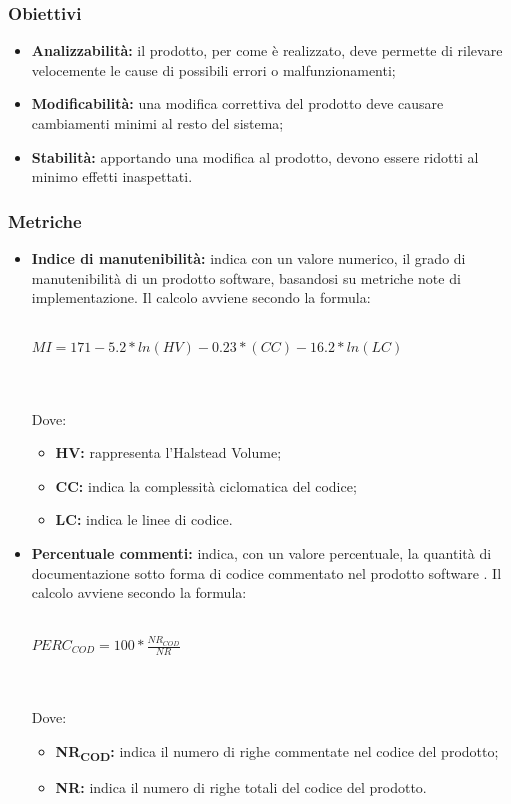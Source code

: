 \subsubsection{Obiettivi}
\begin{itemize}
	\item \textbf{Analizzabilità:} il prodotto, per come è realizzato, deve permette di rilevare velocemente le cause di possibili errori o malfunzionamenti;
	\item \textbf{Modificabilità:} una modifica correttiva del prodotto deve causare cambiamenti minimi al resto del sistema;
	\item \textbf{Stabilità:} apportando una modifica al prodotto, devono essere ridotti al minimo effetti inaspettati.
\end{itemize}
\subsubsection{Metriche}
\begin{itemize}
	\item \textbf{Indice di manutenibilità:} indica con un valore numerico, il grado di manutenibilità di un prodotto software, basandosi su metriche note di implementazione. Il calcolo avviene secondo la formula:\\\\
	\centerline{
		\begin{math}
		MI= 171-5.2*ln(HV)-0.23*(CC)-16.2*ln(LC)
		\end{math}
	}
	\\\\Dove:
	\begin{itemize}
		\item \textbf{HV:} rappresenta l'Halstead Volume;
		\item \textbf{CC:} indica la complessità ciclomatica del codice;
		\item \textbf{LC:} indica le linee di codice.
	\end{itemize}	
	\item \textbf{Percentuale commenti:} indica, con un valore percentuale, la quantità di documentazione sotto forma di codice commentato nel prodotto software . Il calcolo avviene secondo la formula:\\\\
	\centerline{
		\begin{math}
		PERC_{COD}=100*\frac{NR_{COD}}{NR}
		\end{math}
	}
	\\\\Dove:
	\begin{itemize}
		\item \textbf{NR\textsubscript{COD}:} indica il numero di righe commentate nel codice del prodotto;
		\item \textbf{NR:} indica il numero di righe totali del codice del prodotto.
	\end{itemize}
\end{itemize}


